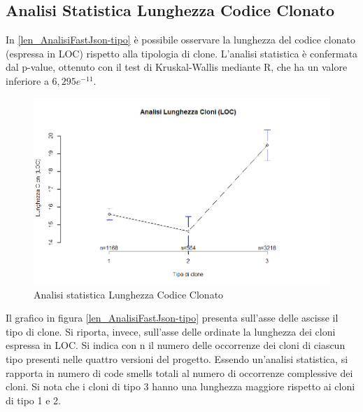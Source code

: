 \subsection{Analisi Statistica Lunghezza Codice Clonato}
In \autoref{len_AnalisiFastJson-tipo} è possibile osservare la lunghezza del codice clonato (espressa in LOC) rispetto alla tipologia di clone. L'analisi statistica è confermata dal p-value, ottenuto con il test di Kruskal-Wallis mediante R, che ha un valore inferiore a $6,295e^{-11}$. \newpage
\begin{figure}[htbp]
	\centering
	\includegraphics[scale=0.5]{analisi_R/AnalisiFastJson/3-gplot-len-type.png}
\caption{Analisi statistica Lunghezza Codice Clonato }
\label{len_AnalisiFastJson-tipo}
\end{figure}
Il grafico in figura \autoref{len_AnalisiFastJson-tipo} presenta sull'asse delle ascisse il tipo di clone. Si riporta, invece, sull'asse delle ordinate la lunghezza dei cloni espressa in LOC. Si indica con n il numero delle occorrenze dei cloni di ciascun tipo presenti nelle quattro versioni del progetto. Essendo un'analisi statistica, si rapporta in numero di code smells totali al numero di occorrenze complessive dei cloni. Si nota che i cloni di tipo 3 hanno una lunghezza maggiore rispetto ai cloni di tipo 1 e 2.